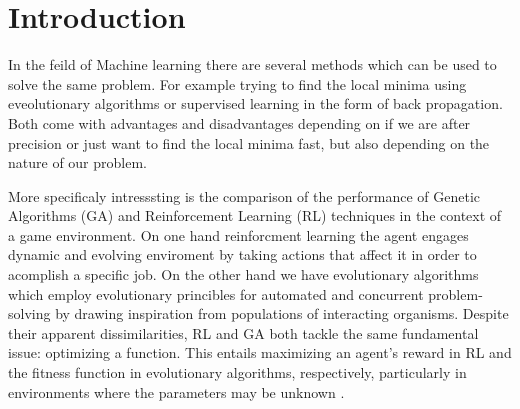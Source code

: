 \section{Introduction}



In the feild of Machine learning there are several methods which can be used to solve the same problem. For example trying to find the local minima using eveolutionary algorithms or supervised learning in the form of back propagation. Both come with advantages and disadvantages depending on if we are after precision or just want to find the local minima fast, but also depending on the nature of our problem.

More specificaly intresssting is the comparison of the performance of Genetic Algorithms (GA) and Reinforcement Learning (RL) techniques in the context of a game environment. On one hand reinforcment learning the agent engages dynamic and evolving enviroment by taking actions that affect it in order to acomplish a specific job. On the other hand we have evolutionary algorithms which employ evolutionary princibles for automated and concurrent problem-solving by drawing inspiration from populations of interacting organisms. Despite their apparent dissimilarities, RL and GA both tackle the same fundamental issue: optimizing a function. This entails maximizing an agent's reward in RL and the fitness function in evolutionary algorithms, respectively, particularly in environments where the parameters may be unknown \cite{drugan2019reinforcement}. 

